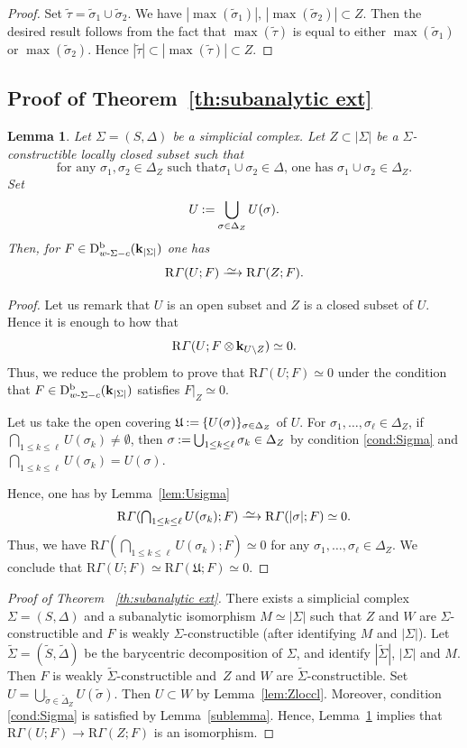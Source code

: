 \documentclass[11pt]{article}
\newcommand{\Subsection}{\subsection}
\numberwithin{equation}{section}
\newcommand{\isom}{\xrightarrow{{\raisebox{-.6ex}[0ex][0ex]{$\mspace{1mu}\textstyle\sim\mspace{2mu}$}}}}
\let \tilde\oldtilde
\let\tilde\widetilde
\theoremstyle{plain}
\newtheorem{lemma}[theorem]{Lemma}
\theoremstyle{definition}
\newcommand{\derived}[1]{\mathrm{#1}}
\newcommand{\derd}{\derived{D}}
\newcommand{\derr}{\derived{R}}
\newcommand{\BDC}{\derd^{\mathrm{b}}}
\newcommand{\field}{\mathbf{k}}\let\cor\field
\newcommand{\rsect}{\derr\varGamma}
\newcommand{\tens}[1][]{\mathbin{\otimes_{\raise1.5ex\hbox to-.1em{}#1}}}
\begin{document}
\begin{proof}
Set $\tilde\tau=\tilde\sigma_1\cup\tilde\sigma_2$.
We have
$|\max(\tilde\sigma_1)|,\,|\max(\tilde\sigma_2)|\subset Z$.
Then the desired result follows from the fact that
$\max(\tilde\tau)$ is equal to either
$\max(\tilde\sigma_1)$ or $\max(\tilde\sigma_2)$.
Hence $|\tilde\tau|\subset|\max(\tilde\tau)|\subset Z$.
\end{proof}

\Subsection{Proof of Theorem~\ref{th:subanalytic ext}}\label{subsec:proof}
\begin{lemma}\label{lem:contr}
Let $\Sigma=(S,\Delta)$ be a simplicial complex.
Let $Z\subset|\Sigma|$ be a $\Sigma$\nobreakdash-constructible locally closed subset such that
\begin{equation}
\text{for any $\sigma_1,\sigma_2\in\Delta_Z$ such that
$\sigma_1\cup \sigma_2\in\Delta$, }
\text{one has $\sigma_1\cup\sigma_2\in\Delta_Z$.}
\label{cond:Sigma}
\end{equation}
Set
\[U\mathbin{:=}\bigcup_{\sigma\in\Delta_Z}U(\sigma).\]
Then, for $F\in\BDC_{w\text-\Sigma-c}(\field_{|\Sigma|})$ one has
\[\rsect(U;F)\isom\rsect(Z;F).\]
\end{lemma}
\begin{proof}
Let us remark that $U$ is an open subset and $Z$ is a closed subset of $U$.
Hence it is enough to how that
\[\rsect(U;F\tens\field_{U\setminus Z})\simeq0.\]
Thus, we reduce the problem to prove that
$\rsect(U;F)\simeq0$ under the condition
that $F\in\BDC_{w\text-\Sigma-c}(\field_{|\Sigma|})$ satisfies $F\vert_Z\simeq0$.

Let us take the open covering
$\mathfrak{U}\mathbin{:=}\{U(\sigma)\}_{\sigma\in\Delta_Z}$ of $U$.
For $\sigma_1,\ldots,\sigma_\ell\in\Delta_Z$,
if $\bigcap_{1\le k\le \ell}U(\sigma_k)\not=\emptyset$, then
$\sigma\mathbin{:=}\bigcup_{1\le k\le \ell}\sigma_k\in\Delta_Z$
by condition \eqref{cond:Sigma} and
$\bigcap_{1\le k\le \ell}U(\sigma_k)=U(\sigma)$.

Hence, one has by Lemma~\ref{lem:Usigma}
\[\rsect(\textstyle\bigcap_{1\le k\le \ell}U(\sigma_k);F)
\isom\rsect(|\sigma|;F)\simeq0.\]
Thus, we have
$\rsect(\bigcap_{1\le k\le \ell}U(\sigma_k);F)\simeq0$ for any
$\sigma_1,\ldots,\sigma_\ell\in\Delta_Z$.
We conclude that $\rsect(U;F)\simeq\rsect(\mathfrak{U};F)\simeq0$.
\end{proof}

\begin{proof}[{Proof of {\rm Theorem ~\ref{th:subanalytic ext}}}]
There exists a simplicial complex $\Sigma=(S,\Delta)$
and a subanalytic isomorphism $M\simeq|\Sigma|$
such that
$Z$ and $W$ are $\Sigma$-constructible and
$F$ is weakly $\Sigma$-constructible (after identifying $M$ and $|\Sigma|$).
Let $\tilde\Sigma=(\tilde S,\tilde\Delta)$ be the barycentric decomposition of $\Sigma$,
and identify $|\tilde\Sigma|$, $|\Sigma|$ and $M$.
Then $F$ is weakly $\tilde\Sigma$-constructible and~$Z$ and $W$ are $\tilde\Sigma$-constructible.
Set $U=\bigcup_{\tilde\sigma\in\tilde\Delta_Z}U(\tilde\sigma)$.
Then $U\subset W$ by Lemma~\ref{lem:Zloccl}.
Moreover, condition \eqref{cond:Sigma} is satisfied by Lemma~\ref{sublemma}.
Hence, Lemma~\ref{lem:contr}
implies that
$\rsect(U;F)\to\rsect(Z;F)$ is an isomorphism.
\end{proof}
\end{document}
